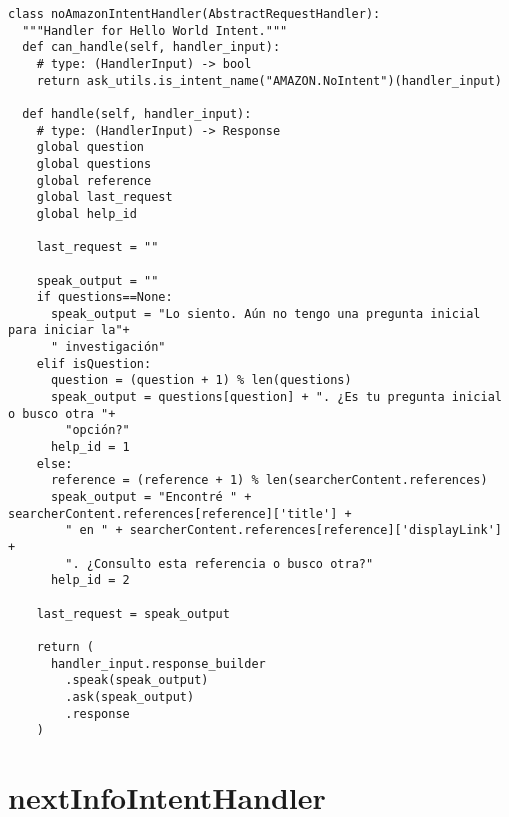 \begin{tcolorbox}[colback=white!25!white,colframe=blue]
  \begin{verbatim}
class noAmazonIntentHandler(AbstractRequestHandler):
  """Handler for Hello World Intent."""
  def can_handle(self, handler_input):
    # type: (HandlerInput) -> bool
    return ask_utils.is_intent_name("AMAZON.NoIntent")(handler_input)

  def handle(self, handler_input):
    # type: (HandlerInput) -> Response
    global question
    global questions
    global reference
    global last_request
    global help_id
    
    last_request = ""
        
    speak_output = ""
    if questions==None:
      speak_output = "Lo siento. Aún no tengo una pregunta inicial para iniciar la"+
      " investigación"
    elif isQuestion:
      question = (question + 1) % len(questions)
      speak_output = questions[question] + ". ¿Es tu pregunta inicial o busco otra "+
        "opción?"
      help_id = 1
    else:
      reference = (reference + 1) % len(searcherContent.references)
      speak_output = "Encontré " + searcherContent.references[reference]['title'] +
        " en " + searcherContent.references[reference]['displayLink'] + 
        ". ¿Consulto esta referencia o busco otra?"
      help_id = 2
    
    last_request = speak_output
    
    return (
      handler_input.response_builder
        .speak(speak_output)
        .ask(speak_output)
        .response
    )
  \end{verbatim}
\end{tcolorbox}


\section{nextInfoIntentHandler}
\label{A9Anexo}


